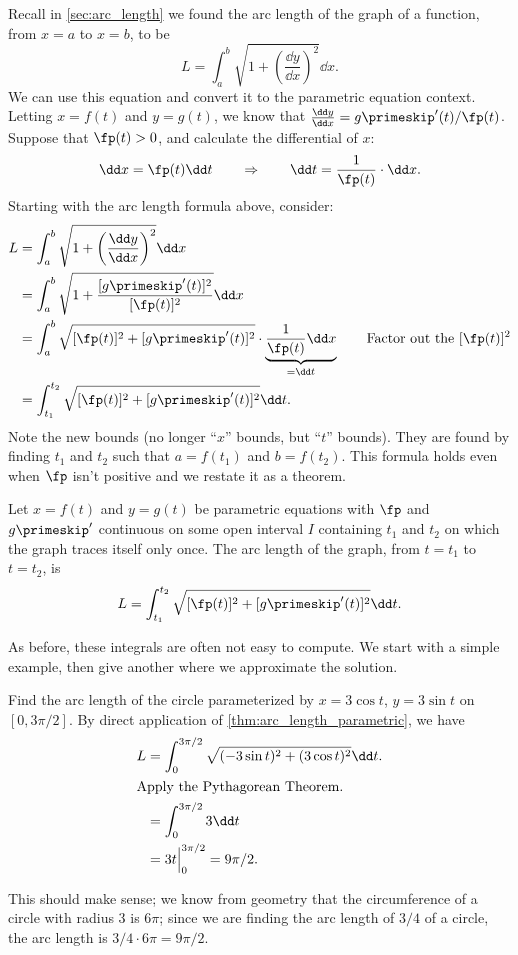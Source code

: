 Recall in \autoref{sec:arc_length} we found the arc length of the graph of a function, from $x=a$ to $x=b$, to be
\[L = \int_a^b\sqrt{1+\left(\frac{\dd y}{\dd x}\right)^2}\dd x.\]
We can use this equation and convert it to the parametric equation context. Letting $x=f(t)$ and $y=g(t)$, we know that $\frac{\dd y}{\dd x} = g\primeskip'(t)/\fp(t)$. Suppose that $\fp(t)>0$, and calculate the differential of $x$:
\[\dd x = \fp(t)\dd t \qquad \Rightarrow \qquad \dd t = \frac{1}{\fp(t)}\cdot \dd x.\]
Starting with the arc length formula above, consider:
\begin{align*}
	L &= \int_a^b\sqrt{1+\left(\frac{\dd y}{\dd x}\right)^2}\dd x\\
	&= \int_a^b \sqrt{1+\frac{[g\primeskip'(t)]^2}{[\fp(t)]^2}}\dd x \\
	&= \int_a^b \sqrt{[\fp(t)]^2+[g\primeskip'(t)]^2}\cdot\underbrace{\frac1{\fp(t)}\dd x}_{=\dd t} \qquad\text{Factor out the $[\fp(t)]^2$} \\
	&= \int_{t_1}^{t_2} \sqrt{[\fp(t)]^2+[g\primeskip'(t)]^2}\dd t.\\
\end{align*}
Note the new bounds (no longer ``$x$'' bounds, but ``$t$'' bounds). They are found by finding $t_1$ and $t_2$ such that $a= f(t_1)$ and $b=f(t_2)$. This formula holds even when $\fp$ isn't positive and we restate it as a theorem.

\begin{theorem}\label{thm:arc_length_parametric}%
Let $x=f(t)$ and $y=g(t)$ be parametric equations with $\fp$ and $g\primeskip'$ continuous on some open interval $I$ containing $t_1$ and $t_2$ on which the graph traces itself only once. The arc length of the graph, from $t=t_1$ to $t=t_2$, is
\[L = \int_{t_1}^{t_2} \sqrt{[\fp(t)]^2+[g\primeskip'(t)]^2}\dd t.\]
\end{theorem}

As before, these integrals are often not easy to compute. We start with a simple example, then give  another where we approximate the solution.

\begin{example}\label{ex_parcalc6}%
Find the arc length of the circle parameterized by $x=3\cos t$, $y=3\sin t$ on $[0,3\pi/2]$. 
\solution
By direct application of \autoref{thm:arc_length_parametric}, we have
\begin{align*}
L &= \int_0^{3\pi/2} \sqrt{(-3\sin t)^2 +(3\cos t)^2} \dd t.\\
\intertext{Apply the Pythagorean Theorem.}
	&= \int_0^{3\pi/2} 3 \dd t\\
	&= 3t\Big|_0^{3\pi/2} = 9\pi/2.
	\end{align*}
	
This should make sense; we know from geometry that the circumference of a circle with radius 3 is $6\pi$; since we are finding the arc length of $3/4$ of a circle, the arc length is $3/4\cdot 6\pi = 9\pi/2$.
\end{example}

